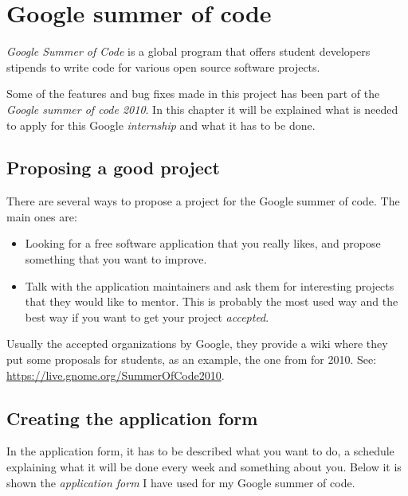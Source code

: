 
\chapter{Google summer of code}


\emph{Google Summer of Code} is a global program that offers student developers stipends to write code for various open source software projects.\cite{website:soc}

Some of the features and bug fixes made in this project has been part of the \emph{Google summer of code 2010}. In this chapter it will be explained what is needed to apply for this Google \emph{internship} and what it has to be done.


\newpage
\section{Proposing a good project}\label{sec:GoodProject}

There are several ways to propose a project for the Google summer of code. The main ones are:
\begin{itemize}
  \item Looking for a free software application that you really likes, and propose something that you want to improve.
  \item Talk with the application maintainers and ask them for interesting projects that they would like to mentor. This is probably the most used way and the best way if you want to get your project \emph{accepted}.
\end{itemize}

Usually the accepted organizations by Google, they provide a wiki where they put some proposals for students, as an example, the one from \GNOME for 2010. See: \url{https://live.gnome.org/SummerOfCode2010}.

\section{Creating the application form}\label{ApplicationForm}

In the application form, it has to be described what you want to do, a schedule explaining what it will be done every week and something about you. Below it is shown the \emph{application form} I have used for my Google summer of code.

